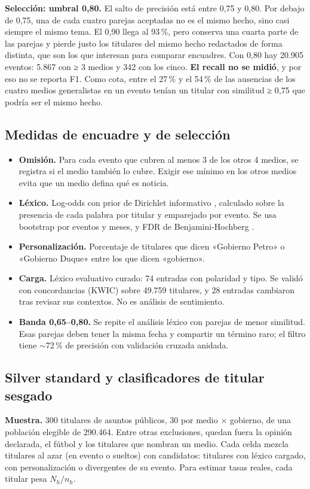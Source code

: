 \documentclass[10pt,twocolumn]{article}
\begin{document}
\textbf{Selección: umbral 0,80.} El salto de precisión está entre 0,75 y 0,80. Por
debajo de 0,75, una de cada cuatro parejas aceptadas no es el mismo hecho, sino
casi siempre el mismo tema. El 0,90 llega al 93\,\%, pero conserva una cuarta
parte de las parejas y pierde justo los titulares del mismo hecho redactados de
forma distinta, que son los que interesan para comparar encuadres. Con 0,80 hay
20.905 eventos: 5.867 con ≥ 3 medios y 342 con los cinco. \textbf{El recall no se
midió}, y por eso no se reporta F1. Como cota, entre el 27\,\% y el 54\,\% de las
ausencias de los cuatro medios generalistas en un evento tenían un titular con
similitud ≥ 0,75 que podría ser el mismo hecho.

\subsection{Medidas de encuadre y de selección}
\begin{itemize}
\item \textbf{Omisión.} Para cada evento que cubren al menos 3 de los otros 4
medios, se registra si el medio también lo cubre. Exigir ese mínimo en los otros
medios evita que un medio defina qué es noticia.
\item \textbf{Léxico.} Log-odds con prior de Dirichlet informativo
\cite{monroe2008}, calculado sobre la presencia de cada palabra por titular y
emparejado por evento. Se usa bootstrap por eventos y meses, y FDR de
Benjamini-Hochberg \cite{bh1995}.
\item \textbf{Personalización.} Porcentaje de titulares que dicen «Gobierno
Petro» o «Gobierno Duque» entre los que dicen «gobierno».
\item \textbf{Carga.} Léxico evaluativo curado: 74 entradas con polaridad y tipo.
Se validó con concordancias (KWIC) sobre 49.759 titulares, y 28 entradas
cambiaron tras revisar sus contextos. No es análisis de sentimiento.
\item \textbf{Banda 0,65--0,80.} Se repite el análisis léxico con parejas de
menor similitud. Esas parejas deben tener la misma fecha y compartir un término
raro; el filtro tiene $\sim$72\,\% de precisión con validación cruzada anidada.
\end{itemize}

\subsection{Silver standard y clasificadores de titular sesgado}\label{sec:clasif}
\textbf{Muestra.} 300 titulares de asuntos públicos, 30 por medio × gobierno, de
una población elegible de 290.464. Entre otras exclusiones, quedan fuera la
opinión declarada, el fútbol y los titulares que nombran un medio. Cada celda mezcla titulares al azar (en evento o
sueltos) con candidatos: titulares con léxico cargado, con personalización o
divergentes de su evento. Para estimar tasas reales, cada titular pesa $N_h/n_h$.
\end{document}
